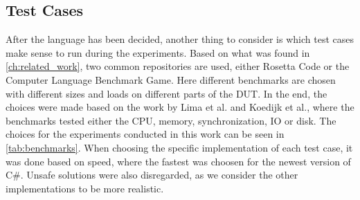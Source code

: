 \subsection{Test Cases}

After the language has been decided, another thing to consider is which test cases make sense to run during the experiments. Based on what was found in \cref{ch:related_work}, two common repositories are used, either Rosetta Code\cite*[]{rosetta_code} or the Computer Language Benchmark Game\cite*[]{benchmark_game}. Here different benchmarks are chosen with different sizes and loads on different parts of the DUT. In the end, the choices were made based on the work by Lima et al.\cite*[]{greenland2016statistical} and Koedijk et al.\cite*[]{Koedijk2022diff}, where the benchmarks tested either the CPU, memory, synchronization, IO or disk. The choices for the experiments conducted in this work can be seen in \cref{tab:benchmarks}. When choosing the specific implementation of each test case, it was done based on speed, where the fastest was choosen for the newest version of C\#. Unsafe solutions were also disregarded, as we consider the other implementations to be more realistic.


